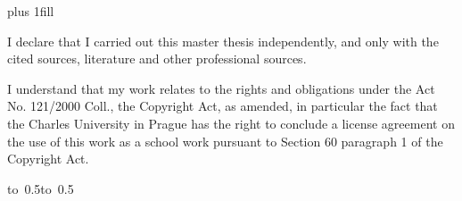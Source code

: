 \documentclass[12pt,a4paper]{report}
\let\openright=\clearpage
\begin{document}
\newpage





\openright

\noindent

\newpage


\vglue 0pt plus 1fill

\noindent
I declare that I carried out this master thesis independently, and only with the cited
sources, literature and other professional sources.

\medskip\noindent
I understand that my work relates to the rights and obligations under the Act No.
121/2000 Coll., the Copyright Act, as amended, in particular the fact that the Charles
University in Prague has the right to conclude a license agreement on the use of this
work as a school work pursuant to Section 60 paragraph 1 of the Copyright Act.

\vspace{10mm}

\hbox{\hbox to 0.5\hbox to 0.5}

\vspace{20mm}
\newpage

\end{document}
